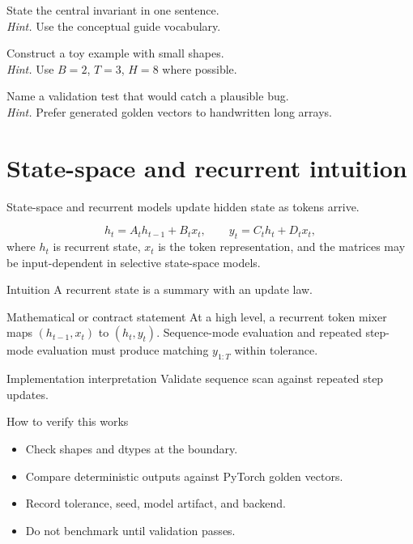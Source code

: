 \begin{chapterexercises}
\item State the central invariant in one sentence.\\
\textit{Hint.} Use the conceptual guide vocabulary.
\item Construct a toy example with small shapes.\\
\textit{Hint.} Use $B=2$, $T=3$, $H=8$ where possible.
\item Name a validation test that would catch a plausible bug.\\
\textit{Hint.} Prefer generated golden vectors to handwritten long arrays.
\end{chapterexercises}

\chapter{State-space and recurrent intuition}
\label{ch:state-space}
State-space and recurrent models update hidden state as tokens arrive. \citep{gu2024mamba}

\[
h_t=A_t h_{t-1}+B_t x_t,\qquad y_t=C_t h_t+D_t x_t,
\]
where \(h_t\) is recurrent state, \(x_t\) is the token representation, and the matrices may be input-dependent in selective state-space models.

\begin{intuitionbox}{Intuition}
A recurrent state is a summary with an update law.
\end{intuitionbox}

\begin{definitionbox}{Mathematical or contract statement}
At a high level, a recurrent token mixer maps \((h_{t-1},x_t)\) to \((h_t,y_t)\). Sequence-mode evaluation and repeated step-mode evaluation must produce matching \(y_{1:T}\) within tolerance.
\end{definitionbox}

\begin{implementationbox}{Implementation interpretation}
Validate sequence scan against repeated step updates.
\end{implementationbox}

\begin{verificationbox}{How to verify this works}
\begin{itemize}
\item Check shapes and dtypes at the boundary.
\item Compare deterministic outputs against PyTorch golden vectors.
\item Record tolerance, seed, model artifact, and backend.
\item Do not benchmark until validation passes.
\end{itemize}
\end{verificationbox}

